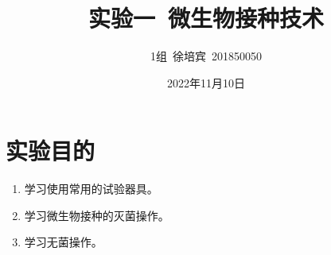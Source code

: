 \documentclass[UTF8]{article}
\title{实验一\ 微生物接种技术}
\author{1组\ 徐培宾\ 201850050}
\date{2022年11月10日}
\begin{document}
    \maketitle
    \section{实验目的}
    \begin{enumerate}
    \item 学习使用常用的试验器具。
    \item 学习微生物接种的灭菌操作。
    \item 学习无菌操作。
    \end{enumerate}



\end{document}
